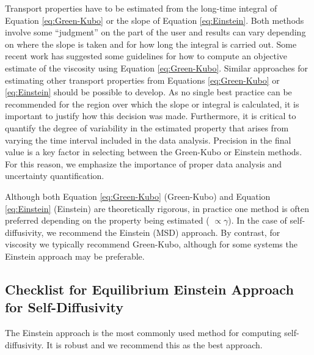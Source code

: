 \documentclass[9pt]{livecoms}
\begin{document}
Transport properties have to be estimated from the long-time integral of Equation \ref{eq:Green-Kubo} or the slope of Equation \ref{eq:Einstein}. Both methods involve some “judgment” on the part of the user and results can vary depending on where the slope is taken and for how long the integral is carried out. Some recent work has suggested some guidelines for how to compute an objective estimate of the viscosity using Equation \ref{eq:Green-Kubo}. Similar approaches for estimating other transport properties from Equations \ref{eq:Green-Kubo} or \ref{eq:Einstein} should be possible to develop. As no single best practice can be recommended for the region over which the slope or integral is calculated, it is important to justify how this decision was made. Furthermore, it is critical to quantify the degree of variability in the estimated property that arises from varying the time interval included in the data analysis. Precision in the final value is a key factor in selecting between the Green-Kubo or Einstein methods. For this reason, we emphasize the importance of proper data analysis and uncertainty quantification.

Although both Equation \ref{eq:Green-Kubo} (Green-Kubo) and Equation \ref{eq:Einstein} (Einstein) are theoretically rigorous, in practice one method is often preferred depending on the property being estimated ( $\propto \gamma$). In the case of self-diffusivity, we recommend the Einstein (MSD) approach. By contrast, for viscosity we typically recommend Green-Kubo, although for some systems the Einstein approach may be preferable.

\subsection{Checklist for Equilibrium Einstein Approach for Self-Diffusivity}


The Einstein approach is the most commonly used method for computing self-diffusivity. It is robust and we recommend this as the best approach.
\end{document}
